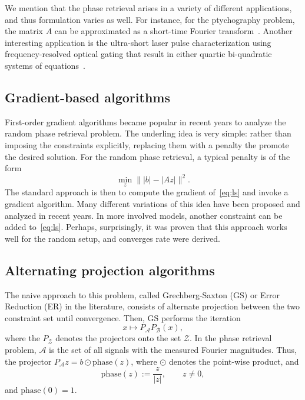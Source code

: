 \documentclass[12pt]{article}
\theoremstyle{definition}
\theoremstyle{remark}
\theoremstyle{definition}
\theoremstyle{problem}
\theoremstyle{definition}
\newcommand{\phase}{\text{phase}}
\newcommand{\A}{\mathcal{A}}
\newcommand{\B}{\mathcal{B}}
\begin{document}
We mention that the phase retrieval arises in a variety of different applications, and thus formulation varies as well. For instance, for the ptychography problem, the matrix $A$ can be approximated as a short-time Fourier transform~\cite{bendory2017non,iwen2018phase}. Another interesting application is the ultra-short laser pulse characterization using frequency-resolved optical gating that result in either quartic bi-quadratic systems of equations~\cite{trebino2012frequency,bendory2018signal,bendory2019blind}.

\subsection{Gradient-based algorithms}
First-order gradient algorithms became popular in recent years to analyze the random phase retrieval problem. The underling idea is very simple: rather than imposing the constraints explicitly, replacing them with a penalty the promote the desired solution.  For the random phase retrieval, a typical penalty is of the form
\begin{equation} \label{eq:ls}
\min_z \| |b| - |Az|\|^2.
\end{equation}
The standard approach is then to compute the gradient of~\eqref{eq:ls} and invoke a gradient algorithm. Many different variations of this idea have been proposed and analyzed in recent years. In more involved models, another constraint can be added to~\eqref{eq:ls}. Perhaps, surprisingly, it was proven that this approach works well for the random setup, and converges rate were derived. 

\subsection{Alternating projection algorithms}

The naive approach to this problem, called Grechberg-Saxton (GS) or Error Reduction (ER) in the literature, consists of alternate projection between the two constraint set until convergence. 
Then, GS performs the iteration 
\begin{equation}\label{eq:GS}
x\mapsto P_\A P_{\B}(x),    
\end{equation}
where the $P_\mathcal{Z}$ denotes the projectors onto the set $\mathcal{Z}$.
In the phase retrieval problem,  $\A$ is the set of all signals with the measured Fourier magnitudes. Thus, the projector $P_\A z=b\odot \phase(z)$, where $\odot$ denotes the point-wise product, and 
\begin{equation*}
\phase(z):=\frac{z}{|z|}, \qquad z\neq 0,
\end{equation*}
and $\phase(0)=1$. 
\end{document}
